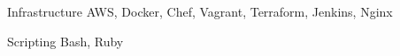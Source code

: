 

\begin{cvskills}

  \cvskill
    {Infrastructure} %
    {AWS, Docker, Chef, Vagrant, Terraform, Jenkins, Nginx} %

  \cvskill
    {Scripting} %
    {Bash, Ruby} %

\end{cvskills}
